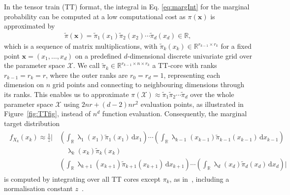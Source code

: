 In the tensor train (TT) format, the integral in Eq. \ref{eq:margInt} for the marginal probability can be computed at a low computational cost as $\pi(\bm{x})$ is approximated by
\begin{align*}
	\tilde{\pi}(\bm{x}) = 	\tilde{\pi}_1(x_1)  \tilde{\pi}_2(x_2)  \cdots \tilde{\pi}_d(x_d)  \in \mathbb{R},
\end{align*}
which is a sequence of matrix multiplications, with $\tilde{\pi}_k(x_k) \in \mathbb{R}^{r_{k-1} \times r_k}$ for a fixed point $\bm{x} = (x_1, \dots, x_d)$ on a predefined $d$-dimensional discrete univariate grid over the parameter space $\mathcal{X}$. 
We call $\tilde{\pi}_k \in \mathbb{R}^{r_{k-1} \times n \times r_k}$ a TT-core with ranks $ r_{k-1} = r_k= r$, where the outer ranks are $r_0 = r_d = 1$, representing each dimension on $n$ grid points and connecting to neighbouring dimensions through its ranks.
This enables us to approximate $\pi(\mathcal{X})\approx \tilde{\pi}_1  \tilde{\pi}_2  \cdots \tilde{\pi}_d$ over the whole parameter space $\mathcal{X}$ using $2nr + (d-2)nr^2$ evaluation points, as illustrated in Figure~\ref{fig:TTfig}, instead of $n^d$ function evaluation.
Consequently, the marginal target distribution
\begin{align}
	\begin{split}
		f_{X_k}(x_k) \approx \frac{1}{z} \Big|\, 
		&\left( \int_{\mathbb{R}} \uplambda_1(x_1) \tilde{\pi}_1(x_1) \, \mathrm{d}x_1 \right) \cdots 
		\left( \int_{\mathbb{R}} \uplambda_{k-1}(x_{k-1}) \tilde{\pi}_{k-1}(x_{k-1}) \, \mathrm{d}x_{k-1} \right) \\
		&\quad \uplambda_k(x_k) \tilde{\pi}_k(x_k) \\
		& \left( \int_{\mathbb{R}} \uplambda_{k+1}(x_{k+1}) \tilde{\pi}_{k+1}(x_{k+1}) \, \mathrm{d}x_{k+1} \right) \cdots 
		\left( \int_{\mathbb{R}} \uplambda_d(x_d) \tilde{\pi}_d(x_d) \, \mathrm{d}x_d \right)
		\Big| 
	\end{split}
\end{align}
is computed by integrating over all TT cores except $\pi_k$, as in~\cite{dolgov2020approximation}, including a normalisation constant $z$~\cite{cui2022deep}.

